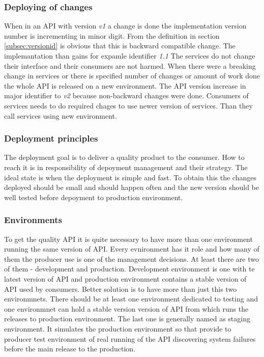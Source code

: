 \subsubsection{Deploying of changes}
When in an API with version \emph{v1} a change is done the implementation version number is incrementing in minor digit. From the definition in section \ref{subsec:versionid} is obvious that this is backward compatible change. The implemantation than gains for expamle identifier \emph{1.1} The services do not change their interface and their consumers are not harmed. 
When there were a breaking change in services or there is specified number of changes or amount of work done the whole API is released on a new environment. The API version increase in major identifier to \emph{v2} because non-backward changes were done. Consumers of services needs to do required chages to use newer version of services. Than they call services using new environment. 

\subsubsection{Deployment principles}
The deployment goal is to deliver a quality product to the consumer. How to reach it is in responsibility of depoyment management and their strategy. The ideal state is when the deployment is simple and fast. To obtain this the changes deployed should be small and should happen often and the new version should be well tested before depoyment to production environment.

\subsubsection{Environments}
To get the quality API it is quite necessary to have more than one environment running the same version of API. Every evnironment has it role and how many of them the producer use is one of the management decisions. At least there are two of them - development and production. Development environment is one with te latest version of API and production environment contains a stable version of API used by consumers.
Better solution is to have more than just this two environmnets. There should be at least one environment dedicated to testing and one environmnet can hold a stable version version of API from which runs the releases to production environment. The last one is generally named as staging environment. It simulates the production environment so that provide to producer test environment of real running of the API discovering system failures before the main release to the production.

